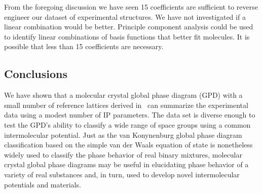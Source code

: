 \documentclass[preprint]{iucr}              %
\newcommand{\mb}[1]{\ensuremath{\mbox{\boldmath $ #1 $}}}
\begin{document}
From the foregoing discussion we have seen 15 coefficients are
sufficient to reverse engineer our dataset of experimental
structures.  We have not investigated if a linear combination would
be better.  Principle component analysis could be used to identify
linear combinations of basis functions that better fit molecules. It
is possible that less than 15 coefficients are necessary.



\subsection{Conclusions}

We have shown that a molecular crystal global phase diagram (GPD)
with a small number of reference lattices derived
in~\cite{McClurg05} can summarize the experimental data using a
modest number of IP parameters. The data set is diverse enough to
test the GPD's ability to classify a wide range of space groups
using a common intermolecular potential. Just as the van Konynenburg
global phase diagram classification based on the simple van der
Waals equation of state is nonetheless widely used to classify the
phase behavior of real binary mixtures, molecular crystal global
phase diagrams may be useful in elucidating phase behavior of a
variety of real substances and, in turn, used to develop novel
intermolecular potentials and materials.
\end{document}
